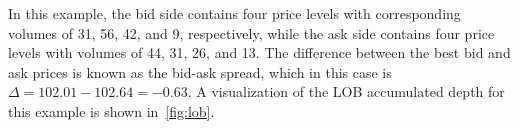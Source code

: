 \begin{table}[H]
    \centering
    \caption{Bid (left) and Ask (right) sides of a Limit Order Book (LOB) $L$}
    \label{tab:lob}
\end{table}

In this example, the bid side contains four price levels with corresponding volumes of 31, 56, 42, and 9, respectively,
while the ask side contains four price levels with volumes of 44, 31, 26, and 13.
The difference between the best bid and ask prices is known as the bid-ask spread, which in this case is $\Delta = 102.01 - 102.64 = -0.63$.
A visualization of the LOB accumulated depth for this example is shown in~\autoref{fig:lob}.

